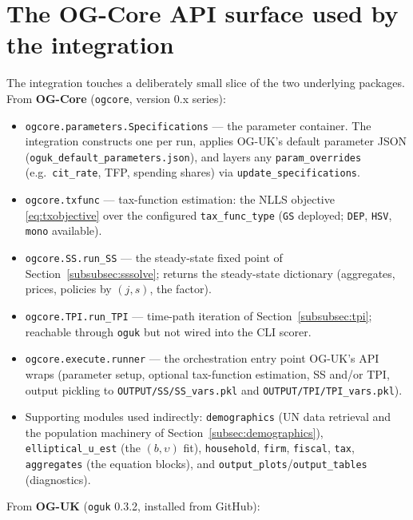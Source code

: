 \section{The OG-Core API surface used by the integration}
\label{app:api}

The integration touches a deliberately small slice of the two underlying packages. From \textbf{OG-Core} (\texttt{ogcore}, version 0.x series):
\begin{itemize}
\item \texttt{ogcore.parameters.Specifications} --- the parameter container. The integration constructs one per run, applies OG-UK's default parameter JSON (\texttt{oguk\_\allowbreak default\_\allowbreak parameters.json}), and layers any \texttt{param\_\allowbreak overrides} (e.g.\ \texttt{cit\_rate}, TFP, spending shares) via \texttt{update\_\allowbreak specifications}.
\item \texttt{ogcore.txfunc} --- tax-function estimation: the NLLS objective \eqref{eq:txobjective} over the configured \texttt{tax\_func\_type} (\texttt{GS} deployed; \texttt{DEP}, \texttt{HSV}, \texttt{mono} available).
\item \texttt{ogcore.SS.run\_SS} --- the steady-state fixed point of Section~\ref{subsubsec:sssolve}; returns the steady-state dictionary (aggregates, prices, policies by $(j,s)$, the factor).
\item \texttt{ogcore.TPI.run\_TPI} --- time-path iteration of Section~\ref{subsubsec:tpi}; reachable through \texttt{oguk} but not wired into the CLI scorer.
\item \texttt{ogcore.execute.runner} --- the orchestration entry point OG-UK's API wraps (parameter setup, optional tax-function estimation, SS and/or TPI, output pickling to \texttt{OUTPUT/\allowbreak SS/\allowbreak SS\_vars.pkl} and \texttt{OUTPUT/\allowbreak TPI/\allowbreak TPI\_vars.pkl}).
\item Supporting modules used indirectly: \texttt{demographics} (UN data retrieval and the population machinery of Section~\ref{subsec:demographics}), \texttt{elliptical\_u\_est} (the $(b,\upsilon)$ fit), \texttt{household}, \texttt{firm}, \texttt{fiscal}, \texttt{tax}, \texttt{aggregates} (the equation blocks), and \texttt{output\_plots}/\texttt{output\_tables} (diagnostics).
\end{itemize}
From \textbf{OG-UK} (\texttt{oguk} 0.3.2, installed from GitHub):
